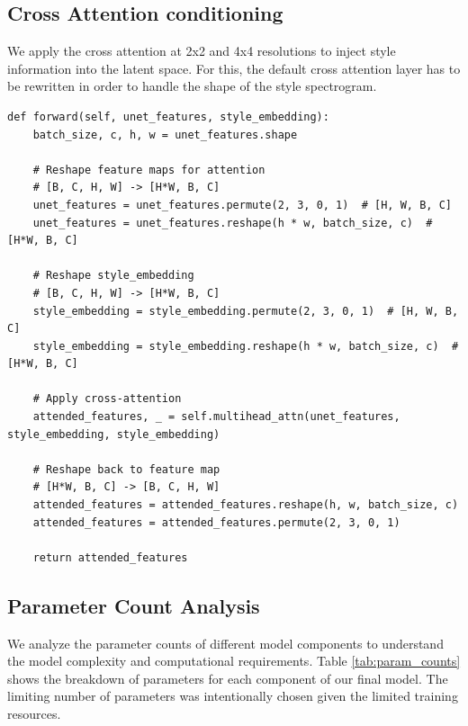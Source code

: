 \subsection{Cross Attention conditioning}

We apply the cross attention at 2x2 and 4x4 resolutions to inject style information into the latent space. For this, the default cross attention layer has to be rewritten in order to handle the shape of the style spectrogram.
\begin{lstlisting}[basicstyle=\tiny]
def forward(self, unet_features, style_embedding):
    batch_size, c, h, w = unet_features.shape

    # Reshape feature maps for attention
    # [B, C, H, W] -> [H*W, B, C]
    unet_features = unet_features.permute(2, 3, 0, 1)  # [H, W, B, C]
    unet_features = unet_features.reshape(h * w, batch_size, c)  # [H*W, B, C]
    
    # Reshape style_embedding
    # [B, C, H, W] -> [H*W, B, C]
    style_embedding = style_embedding.permute(2, 3, 0, 1)  # [H, W, B, C]
    style_embedding = style_embedding.reshape(h * w, batch_size, c)  # [H*W, B, C]

    # Apply cross-attention
    attended_features, _ = self.multihead_attn(unet_features, style_embedding, style_embedding)
    
    # Reshape back to feature map
    # [H*W, B, C] -> [B, C, H, W]
    attended_features = attended_features.reshape(h, w, batch_size, c)
    attended_features = attended_features.permute(2, 3, 0, 1)
    
    return attended_features
\end{lstlisting}

\subsection{Parameter Count Analysis}

We analyze the parameter counts of different model components to understand the model complexity and computational requirements. Table \ref{tab:param_counts} shows the breakdown of parameters for each component of our final model. The limiting number of parameters was intentionally chosen given the limited training resources.

